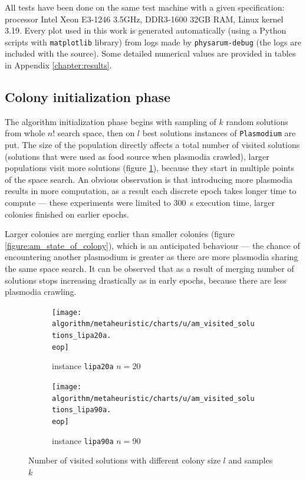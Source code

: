 \documentclass[english,a4paper,twoside]{ppfcmthesis}
\begin{document}
All tests have been done on the same test machine with a given specification: processor Intel Xeon E3-1246 3.5GHz, DDR3-1600 32GB RAM, Linux kernel 3.19. Every plot used in this work is generated automatically (using a Python scripts with \texttt{matplotlib} library) from logs made by \texttt{physarum-debug} (the logs are included with the source). Some detailed numerical values are provided in tables in Appendix \ref{chapter:results}.


\subsection{Colony initialization phase}

The algorithm initialization phase begins with sampling of $k$ random solutions from whole $n!$ search space, then on $l$ best solutions instances of \texttt{Plasmodium} are put. The size of the population directly affects a total number of visited solutions (solutions that were used as food source when plasmodia crawled), larger populations visit more solutions (figure \ref{figure:am_visited_solutions}), because they start in multiple points of the space search. An obvious observation is that introducing more plasmodia results in more computation, as a result each discrete epoch takes longer time to compute --- these experiments were limited to 300~s execution time, larger colonies finished on earlier epochs.

Larger colonies are merging earlier than smaller colonies (figure \ref{figure:am_state_of_colony}), which is an anticipated behaviour --- the chance of encountering another plasmodium is greater as there are more plasmodia sharing the same space search. It can be observed that as a result of merging number of solutions stops increasing drastically as in early epochs, because there are less plasmodia crawling.

\begin{figure}
  \centering

  \begin{subfigure}{\textwidth}
    \texttt{[image: algorithm/metaheuristic/charts/u/am\_visited\_solutions\_lipa20a.\\eop]}
    \caption{instance \texttt{lipa20a} $n=20$}
  \end{subfigure}
  \par\bigskip
  \begin{subfigure}{\textwidth}
    \texttt{[image: algorithm/metaheuristic/charts/u/am\_visited\_solutions\_lipa90a.\\eop]}
    \caption{instance \texttt{lipa90a} $n=90$}
  \end{subfigure}

  \caption{Number of visited solutions with different colony size $l$ and samples $k$}
  \label{figure:am_visited_solutions}
\end{figure}
\end{document}

